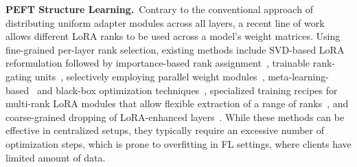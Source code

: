 \noindent\textbf{PEFT Structure Learning.}~Contrary to the conventional approach of distributing uniform adapter modules across all layers, a recent line of work allows different LoRA ranks to be used across a model's weight matrices. Using fine-grained per-layer rank selection, existing methods include SVD-based LoRA reformulation followed by importance-based rank assignment~\cite{adalora}, trainable rank-gating units~\cite{sora2023emnlp}, selectively employing parallel weight modules~\cite{capaboost2024iclr}, meta-learning-based~\cite{autolora} and black-box optimization techniques~\cite{hpolorallm2024aaaiw}, specialized training recipes for multi-rank LoRA modules that allow flexible extraction of a range of ranks~\cite{dylora2023eacl}, and coarse-grained dropping of LoRA-enhanced layers~\cite{yao2024layer}. While these methods can be effective in centralized setups, they typically require an excessive number of optimization steps, which is prone to overfitting in FL settings, where clients have limited amount of data.
